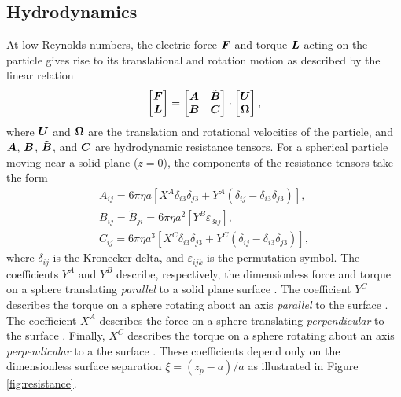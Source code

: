 \begin{appendices}
\subsection{Hydrodynamics}

At low Reynolds numbers, the electric force $\boldsymbol{F}$ and torque $\boldsymbol{L}$ acting on the particle gives rise to its translational and rotation motion as described by the linear relation
\begin{equation}
    \begin{bmatrix}
    \boldsymbol{F} \\ \boldsymbol{L}
    \end{bmatrix}
    =
    \begin{bmatrix}
    \boldsymbol{A} & \tilde{\boldsymbol{B}}
    \\ 
    \boldsymbol{B} & \boldsymbol{C}
    \end{bmatrix}
    \cdot
    \begin{bmatrix}
    \boldsymbol{U} \\ \boldsymbol{\Omega}
    \end{bmatrix}, \label{eq:resistance}
\end{equation}
where $\boldsymbol{U}$ and $\boldsymbol{\Omega}$ are the translation and rotational velocities of the particle, and  $\boldsymbol{A}$, $\boldsymbol{B}$, $\tilde{\boldsymbol{B}}$, and $\boldsymbol{C}$ are hydrodynamic resistance tensors.  For a spherical particle moving near a solid plane ($z=0$), the components of the resistance tensors take the form 
\begin{gather}
    A_{ij} = 6\pi\eta a \left[ X^A \delta_{i3}\delta_{j3} + Y^A (\delta_{ij} - \delta_{i3}\delta_{j3}) \right], 
    \\
    B_{ij} = \tilde{B}_{ji} = 6\pi\eta a^2 \left[ Y^B \varepsilon_{3ij} \right],
    \\
    C_{ij} = 6\pi\eta a^3 \left[  X^C \delta_{i3}\delta_{j3} + Y^C (\delta_{ij} - \delta_{i3}\delta_{j3}) \right], 
\end{gather}
where $\delta_{ij}$ is the Kronecker delta, and $\varepsilon_{ijk}$ is the permutation symbol. The coefficients $Y^A$ and $Y^B$ describe, respectively, the dimensionless force and torque on a sphere translating \emph{parallel} to a solid plane surface \cite{ONeill1964a}. The coefficient $Y^C$ describes the torque on a sphere rotating about an axis \emph{parallel} to the surface \cite{Dean1963}. The coefficient $X^A$ describes the force on a sphere translating \emph{perpendicular} to the surface \cite{Brenner1961a}.  Finally, $X^C$ describes the torque on a sphere rotating about an axis \emph{perpendicular} to a the surface \cite{Jeffrey1915}. These coefficients depend only on the dimensionless surface separation $\xi = (z_p - a)/a$ as illustrated in Figure \ref{fig:resistance}. 


\end{appendices}
